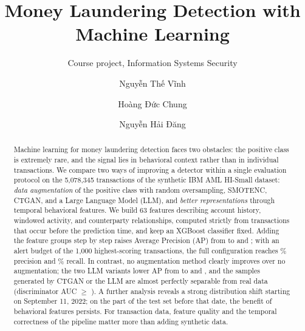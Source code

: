 \documentclass[sigconf,nonacm]{acmart}
\begin{document}
\title{Money Laundering Detection with Machine Learning}
\subtitle{Course project, Information Systems Security}

\author{Nguyễn Thế Vĩnh}

\author{Hoàng Đức Chung}

\author{Nguyễn Hải Đăng}

\renewcommand{\shortauthors}{Nguyễn Thế Vĩnh, Hoàng Đức Chung, and Nguyễn Hải Đăng}

\begin{abstract}
Machine learning for money laundering detection faces two obstacles: the positive class is extremely rare, and
the signal lies in behavioral context rather than in individual transactions. We compare two ways of improving a
detector within a single evaluation protocol on the 5,078,345 transactions of the synthetic IBM AML HI-Small
dataset: \emph{data augmentation} of the positive class with random oversampling, SMOTENC, CTGAN, and a Large
Language Model (LLM), and \emph{better representations} through temporal behavioral features. We build 63 features
describing account history, windowed activity, and counterparty relationships, computed strictly from transactions
that occur before the prediction time, and keep an XGBoost classifier fixed. Adding the feature groups step by step
raises Average Precision (AP) from \FZeroAP{} to \FOneAP{} and \FFourAP; with an alert budget of the 1,000
highest-scoring transactions, the full configuration reaches \FFourPkPct\% precision and \FFourRkPct\% recall. In
contrast, no augmentation method clearly improves over no augmentation; the two LLM variants lower AP from
\EZeroAP{} to \ELLMaAP{} and \ELLMbAP, and the samples generated by CTGAN or the LLM are almost perfectly separable
from real data (discriminator AUC $\geq$ \ELLMaDisc). A further analysis reveals a strong distribution shift starting
on September 11, 2022; on the part of the test set before that date, the benefit of behavioral features persists.
For transaction data, feature quality and the temporal correctness of the pipeline matter more than adding
synthetic data.
\end{abstract}
\end{document}

